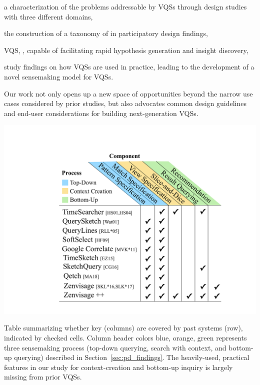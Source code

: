 \begin{denselist}
\item a characterization of the problems addressable by VQSs through design studies with three different domains,
\item the construction of a taxonomy of  in participatory design findings, %
\item {} VQS, \zvpp,  capable of facilitating rapid hypothesis generation and insight discovery,
\item study findings on how VQSs are used in practice, leading to the development of a novel sensemaking model for VQSs. %
\end{denselist}
Our work not only opens up a new space of opportunities beyond the narrow use cases considered by prior studies, but also advocates common design guidelines and end-user considerations for building next-generation VQSs.
\begin{table}[h!]
    \centering
    \includegraphics[width=0.8\linewidth]{figures/related_works_table.pdf}
    \caption{Table summarizing whether key  (columns) are covered by past systems (row), indicated by checked cells. Column header colors blue, orange, green represents three sensemaking process (top-down querying, search with context, and bottom-up querying) described in Section~\ref{sec:pd_findings}. The heavily-used, practical features in our study for context-creation and bottom-up inquiry is largely missing from prior VQSs.}
    \label{table:relatedwork}
    \vspace*{-15pt}
\end{table}
